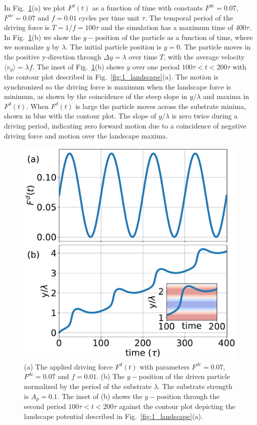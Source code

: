 \documentclass[twocolumn,preprintnumbers,amsmath,amssymb,aps,prb]{revtex4}
\begin{document}
In Fig.~\ref{fig:2_Fd_vy_time}(a)
we plot $F^d(t)$ 
as a function of time with
constants $F^{dc}=0.07$, 
$F^{ac}=0.07$ and $f=0.01$ cycles per time unit $\tau$.
The temporal period of the driving force is
$T = 1/f = 100 \tau$ and 
the simulation has a maximum
time of $400 \tau$.
In Fig.~\ref{fig:2_Fd_vy_time}(b) 
we show the $y-$position of the particle
as a function of time,
where we 
normalize $y$ by $\lambda$.
The initial particle position is $y = 0 $. 
The particle moves
in the positive y-direction
through $\Delta y = \lambda$ over time $T$,
with 
the average velocity 
$\langle {v}_y \rangle = \lambda f$. 
The inset of Fig.~\ref{fig:2_Fd_vy_time}(b)
shows $y$ 
over one period $100\tau < t < 200 \tau$
with 
the contour plot described
in Fig.~\ref{fig:1_landscape}(a).
The motion is synchronized so the 
driving force is maximum when the landscape 
force is minimum,
as shown by the coincidence of the
steep slope in 
$y/\lambda$ 
and maxima in $F^d(t)$.
When $F^d(t)$ is large 
the particle moves across the substrate minima,
shown in blue with the contour plot.
The slope of $y/\lambda$ is zero twice
during a driving period,
indicating zero
forward motion 
due to a coincidence of negative
driving force and motion over the landscape maxima.
\begin{figure} %
\centering
\includegraphics[width=\columnwidth]{fig2_Fd_vy_time.pdf}
\caption{(a) The applied driving force $F^d(t)$ 
  with parameters $F^{dc} = 0.07$, $F^{dc} = 0.07$ and $f=0.01$.
  (b) 
  The $y-$position of the driven particle
  normalized by the period of the substrate $\lambda$.
  The substrate strength is $A_p=0.1$.
  The inset of (b) shows
  the $y-$position
  through the second period $100\tau<t<200\tau$
  against the contour plot depicting
  the landscape potential described in Fig.~\ref{fig:1_landscape}(a).
  }
\label{fig:2_Fd_vy_time}
\end{figure}
\end{document}
